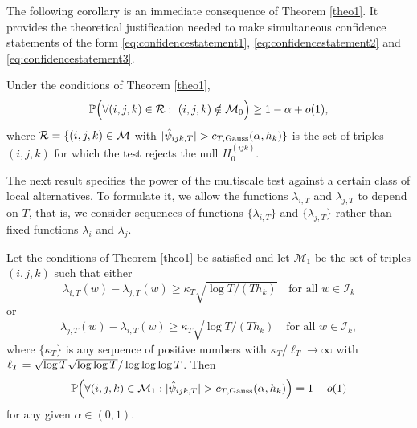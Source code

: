 \documentclass[a4paper,12pt]{article}
\numberwithin{equation}{section}
\begin{document}
The following corollary is an immediate consequence of Theorem \ref{theo1}. It provides the theoretical justification needed to make simultaneous confidence statements of {\color{red} the form \eqref{eq:confidencestatement1}, \eqref{eq:confidencestatement2} and \eqref{eq:confidencestatement3}.}
{\color{red}
\begin{corollaryA}\label{corollary1}
Under the conditions of Theorem \ref{theo1}, 
\begin{align}
\mathbb{P}\Big( \forall (i,j,k) \in \mathcal{R}: \ (i,j,k) \notin \mathcal{M}_0 \Big) \ge 1 - \alpha + o(1), \label{eq:simconfstat}
\end{align} 
where $\mathcal{R} = \{ (i,j,k) \in \mathcal{M}$ with $|\hat{\psi}_{ijk,T}| > c_{T,\textnormal{Gauss}}(\alpha,h_k) \}$ is the set of triples $(i,j,k)$ for which the test rejects the null $H_0^{(ijk)}$.
\end{corollaryA} 


The next result specifies the power of the multiscale test against a certain class of local alternatives. To formulate it, we allow the functions $\lambda_{i, T}$ and $\lambda_{j, T}$ to depend on $T$, that is, we consider sequences of functions $\{\lambda_{i, T}\}$ and $\{\lambda_{j, T}\}$ rather than fixed functions $\lambda_i$ and $\lambda_j$. 
\begin{propA}\label{prop1}
Let the conditions of Theorem \ref{theo1} be satisfied and let $\mathcal{M}_1$ be the set of triples $(i,j,k)$ such that either
\begin{equation}\label{loc-alternative-1}
\lambda_{i, T}(w) - \lambda_{j, T}(w) \ge \kappa_T \sqrt{\log T / (T h_{k})} \quad \text{for all } w \in \mathcal{I}_{k} 
\end{equation}
or 
\begin{equation}\label{loc-alternative-2}
\lambda_{j, T}(w) - \lambda_{i, T}(w) \ge \kappa_T \sqrt{\log T / (T h_{k})} \quad \text{for all } w \in \mathcal{I}_{k}, 
\end{equation}
where $\{\kappa_T\}$ is any sequence of positive numbers with $\kappa_T / \ell_T \to \infty$ with $\ell_T = \sqrt{\log T} \linebreak \sqrt{\log \log T} / \log \log \log T$. Then 
\[ \mathbb{P}\Big( \forall (i,j,k) \in \mathcal{M}_1: |\hat{\psi}_{ijk,T}| > c_{T,\textnormal{Gauss}}(\alpha,h_k) \Big) = 1 - o(1) \]
for any given $\alpha \in (0, 1)$. 
\end{propA}}
\end{document}
